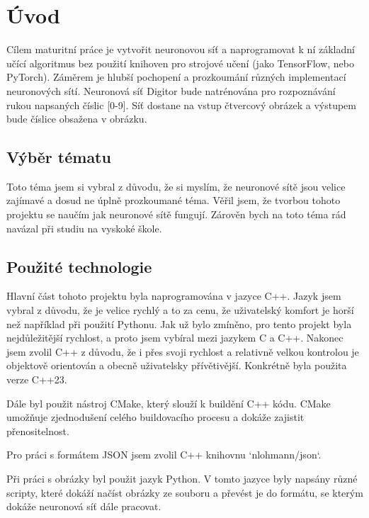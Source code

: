 \section{Úvod}
Cílem maturitní práce je vytvořit neuronovou síť a naprogramovat k ní základní učící algoritmus bez použití knihoven pro strojové učení (jako TensorFlow, nebo PyTorch).
Záměrem je hlubší pochopení a prozkoumání různých implementací neuronových sítí.
Neuronová síť Digitor bude natrénována pro rozpoznávání rukou napsaných číslic [0-9].
Síť dostane na vstup čtvercový obrázek a výstupem bude číslice obsažena v obrázku.

\subsection{Výběr tématu}
Toto téma jsem si vybral z důvodu, že si myslím, že neuronové sítě jsou velice zajímavé a dosud ne úplně prozkoumané téma.
Věřil jsem, že tvorbou tohoto projektu se naučím jak neuronové sítě fungují.
Zárověn bych na toto téma rád navázal při studiu na vyskoké škole.

\subsection{Použité technologie}
Hlavní část tohoto projektu byla naprogramována v jazyce C++.
Jazyk jsem vybral z důvodu, že je velice rychlý a to za cenu, že uživatelský komfort je horší než například při použití Pythonu.
Jak už bylo zmíněno, pro tento projekt byla nejdůležitější rychlost, a proto jsem vybíral mezi jazykem C a C++.
Nakonec jsem zvolil C++ z důvodu, že i přes svoji rychlost a relativně velkou kontrolou je objektově orientován a obecně uživatelsky přívětivější.
Konkrétně byla použita verze C++23.

Dále byl použit nástroj CMake, který slouží k buildění C++ kódu.
CMake umožňuje zjednodušení celého buildovacího procesu a dokáže zajistit přenositelnost.

Pro práci s formátem JSON jsem zvolil C++ knihovnu `nlohmann/json`\cite{json}.

Při práci s obrázky byl použit jazyk Python. V tomto jazyce byly napsány různé scripty,
které dokáží načíst obrázky ze souboru a převést je do formátu, se kterým dokáže neuronová síť dále pracovat.

